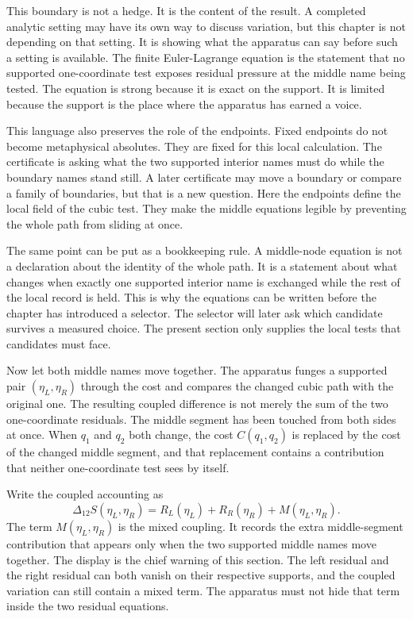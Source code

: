 This boundary is not a hedge. It is the content of the result. A completed analytic setting may have its own way to discuss variation, but this chapter is not depending on that setting. It is showing what the apparatus can
say before such a setting is available. The finite Euler-Lagrange equation is
the statement that no supported one-coordinate test exposes residual pressure
at the middle name being tested. The equation is strong because it is exact on
the support. It is limited because the support is the place where the
apparatus has earned a voice.

This language also preserves the role of the endpoints. Fixed endpoints do
not become metaphysical absolutes. They are fixed for this local calculation.
The certificate is asking what the two supported interior names must do while
the boundary names stand still. A later certificate may move a boundary or
compare a family of boundaries, but that is a new question. Here the endpoints
define the local field of the cubic test. They make the middle equations
legible by preventing the whole path from sliding at once.

The same point can be put as a bookkeeping rule. A middle-node equation is not
a declaration about the identity of the whole path. It is a statement about
what changes when exactly one supported interior name is exchanged while the
rest of the local record is held. This is why the equations can be written
before the chapter has introduced a selector. The selector will later ask
which candidate survives a measured choice. The present section only supplies
the local tests that candidates must face.

Now let both middle names move together. The apparatus funges a supported pair \((\eta_L,\eta_R)\) through the cost and compares the changed cubic path with the original one. The resulting coupled difference is not merely the
sum of the two one-coordinate residuals. The middle segment has been touched
from both sides at once. When \(q_1\) and \(q_2\) both change, the cost
\(C(q_1,q_2)\) is replaced by the cost of the changed middle segment, and that
replacement contains a contribution that neither one-coordinate test sees by
itself.

Write the coupled accounting as
\[
  \Delta_{12}S(\eta_L,\eta_R)
    = R_L(\eta_L) + R_R(\eta_R) + M(\eta_L,\eta_R).
\]
The term \(M(\eta_L,\eta_R)\) is the mixed coupling. It records the extra
middle-segment contribution that appears only when the two supported middle
names move together. The display is the chief warning of this section. The
left residual and the right residual can both vanish on their respective
supports, and the coupled variation can still contain a mixed term. The
apparatus must not hide that term inside the two residual equations.

